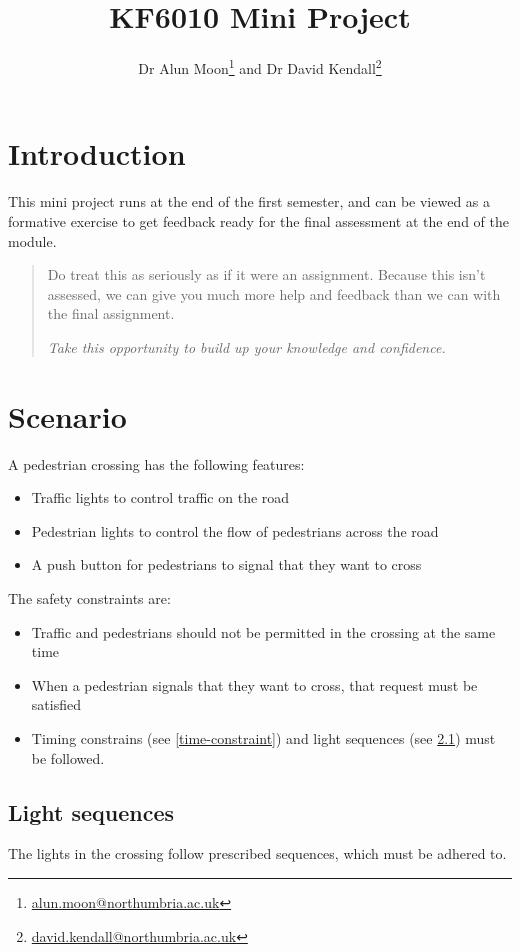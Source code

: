 \documentclass{article}
\title{KF6010 Mini Project}
\author{Dr Alun Moon\thanks{\url{alun.moon@northumbria.ac.uk}} and
Dr David Kendall\thanks{\url{david.kendall@northumbria.ac.uk}}}
\begin{document}
\maketitle

\begin{abstract}
\end{abstract}

\section{Introduction}
	This mini project runs at the end of the first semester, and can be viewed
	as a formative exercise to get feedback ready for the final assessment at
	the end of the module.
	\begin{quote}
		Do treat this as seriously as if it were an assignment.
		Because this isn't assessed, we can give you much more help and
		feedback than we can with the final assignment.  

		\emph{Take this opportunity to build up your knowledge and confidence.}
	\end{quote}

\section{Scenario}
A pedestrian crossing has the following features:
\begin{itemize}
	\item Traffic lights to control traffic on the road
	\item Pedestrian lights to control the flow of pedestrians across the road
	\item A push button for pedestrians to signal that they want to cross
\end{itemize}
The safety constraints are:
\begin{itemize}
	\item Traffic and pedestrians should not be permitted in the crossing at
		the same time
	\item When a pedestrian signals that they want to cross, that request must
		be satisfied
	\item Timing constrains (see \ref{time-constraint}) and light
		sequences (see \ref{light-sequence}) must be followed.
\end{itemize}

\clearpage
\subsection{Light sequences}\label{light-sequence}
The lights in the crossing follow prescribed sequences, which must be adhered
to.
\end{document}
